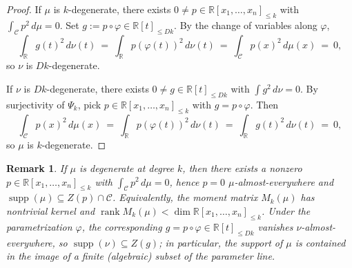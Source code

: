 \documentclass[11pt,a4paper]{amsart}
\numberwithin{equation}{section}
\newtheorem{remark}[thm]{Remark}
\theoremstyle{definition}
\newcommand{\R}{\mathbb{R}}
\DeclareMathOperator{\supp}{supp}
\DeclareMathOperator{\rank}{rank}
\numberwithin{thm}{section}
\theoremstyle{break}
\numberwithin{subcase}{case}
\begin{document}
\begin{proof}
 If $\mu$ is $k$-degenerate, there exists $0\neq p\in\R[x_1,\dots,x_n]_{\le k}$ with $\int_{\mathcal C}p^2\,d\mu=0$. Set $g:=p\circ\varphi\in\R[t]_{\le Dk}$. By the change of variables along $\varphi$,
\[
\int_{\R} g(t)^2\,d\nu(t)\ =\ \int_{\R} p(\varphi(t))^2\,d\nu(t)\ =\ \int_{\mathcal C} p(x)^2\,d\mu(x)\ =\ 0,
\]
so $\nu$ is $Dk$-degenerate.

 If $\nu$ is $Dk$-degenerate, there exists $0\neq g\in\R[t]_{\le Dk}$ with $\int g^2\,d\nu=0$. By surjectivity of $\Psi_k$, pick $p\in\R[x_1,\dots,x_n]_{\le k}$ with $g=p\circ\varphi$. Then
\[
\int_{\mathcal C} p(x)^2\,d\mu(x)\ =\ \int_{\R} p(\varphi(t))^2\,d\nu(t)\ =\ \int_{\R} g(t)^2\,d\nu(t)\ =\ 0,
\]
so $\mu$ is $k$-degenerate.
\end{proof}
\begin{remark}
If $\mu$ is degenerate at degree $k$, then there exists a nonzero $p\in\R[x_1,\dots,x_n]_{\le k}$ with $\int_{\mathcal C} p^2\,d\mu=0$, hence $p=0$ $\mu$-almost-everywhere and $\supp(\mu)\subseteq Z(p)\cap \mathcal C$. Equivalently, the moment matrix $M_k(\mu)$ has nontrivial kernel and $\rank M_k(\mu)<\dim\R[x_1,\dots,x_n]_{\le k}$. Under the parametrization $\varphi$, the corresponding $g=p\circ\varphi\in\R[t]_{\le Dk}$ vanishes $\nu$-almost-everywhere, so $\supp(\nu)\subseteq Z(g)$; in particular, the support of $\mu$ is contained in the image of a finite (algebraic) subset of the parameter line.
\end{remark}
\end{document}

